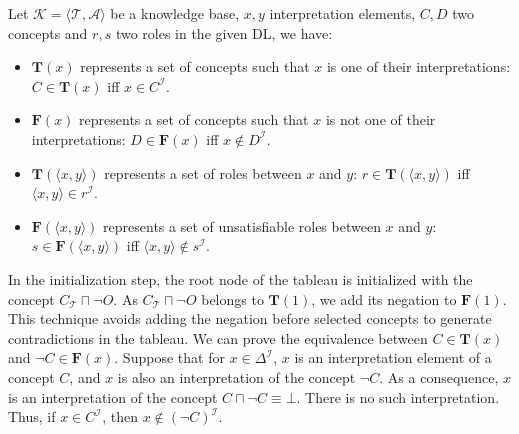 \documentclass{article}
\begin{document}
 Let $\mathcal{K}=\langle \mathcal{T},\mathcal{A}\rangle$ be a knowledge base,  $x,y$ interpretation elements, $C,D$  two concepts and $r, s$ two roles in the given DL,
 we have:
 \begin{itemize}
 \item   $\mathbf{T}(x)$ represents a set of concepts such that $x$ is one of their interpretations:
   $C\in \mathbf{T}(x)$ iff $x \in C^\mathcal{I}$.
 \item   $\mathbf{F}(x)$ represents a set of concepts such that $x$ is not one of their interpretations:
  $D\in \mathbf{F}(x)$ iff $x \notin D^\mathcal{I}$.
 \item   $\mathbf{T}(\langle x,y \rangle)$ represents a set of roles between $x$ and $y$:
  $r\in \mathbf{T}(\langle x,y \rangle)$ iff $\langle x, y \rangle \in r^\mathcal{I}$.
 \item   $\mathbf{F}(\langle x,y \rangle)$ represents a set of unsatisfiable roles between $x$ and $y$:
  $s\in \mathbf{F}(\langle x,y \rangle)$ iff $\langle x, y \rangle \notin s^\mathcal{I}$.
 \end{itemize}
 
 In the initialization step, the root node of the tableau is initialized with the concept $C_\mathcal{T}\sqcap \neg O$.
 As $C_\mathcal{T}\sqcap \neg O$ belongs to $\mathbf{T}(1)$, we add its negation to $\mathbf{F}(1)$.
 This technique avoids adding the negation before selected concepts to generate contradictions in the tableau.
 We can prove the equivalence between $ C\in \mathbf{T}(x) $ and $\neg C \in \mathbf {F}(x)$. Suppose that for $x \in \Delta^\mathcal{I}$, $x$ is an interpretation element of a concept $C$,
and $x$ is also an interpretation of the concept $\neg C$. As a consequence, $x$ is an interpretation of the concept $C\sqcap\neg C\equiv \bot$. There is no such interpretation.
Thus, if $x\in C^\mathcal{I}$, then $x \notin(\neg C)^\mathcal{I}$.
 
\end{document}
